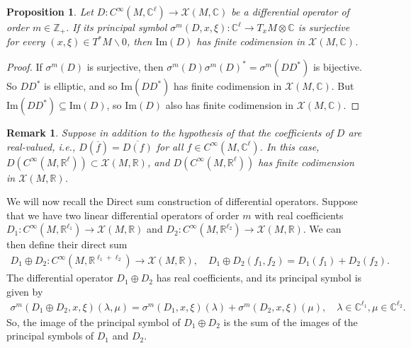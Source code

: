 \documentclass[10pt]{article}
\newcommand{\C}{{\mathbb C}}
\newcommand{\R}{{\mathbb R}}
\newcommand{\Z}{{\mathbb Z}}
\newcommand{\Chi}{{\mathcal X}}
\newtheorem{prop}{Proposition}
\newtheorem{rem}{Remark}
\begin{document}
\begin{prop} \label{theorem : principal symbol surjective}
    Let $D : C^{\infty}(M,\C^\ell)\rightarrow \Chi(M,\C)$ be a differential operator of order $m\in \Z_+$. If its principal symbol $\sigma^m(D,x,\xi): \C^\ell \rightarrow T_xM\otimes \C$ is surjective for every $(x,\xi)\in T^*M \backslash 0$, then $\mathrm{Im}(D)$ has finite codimension in $\Chi(M,\C)$.
\end{prop}
\begin{proof}
    If $\sigma^m(D)$ is surjective, then $\sigma^m(D)\sigma^m(D)^*=\sigma^m(DD^*)$ is bijective. So $DD^*$ is elliptic, and so $\mathrm{Im}(DD^*)$ has finite codimension in $\Chi(M,\C)$. But $\mathrm{Im}(DD^*)\subseteq \mathrm{Im}(D)$, so $\mathrm{Im}(D)$ also has finite codimension in $\Chi(M,\C)$.
\end{proof}

\begin{rem}
    Suppose in addition to the hypothesis of  that the coefficients of $D$ are real-valued, i.e., $D(\overline{f})=\overline{D(f)}$ for all $f\in C^{\infty}(M,\C^\ell)$.
    In this case, $D(C^{\infty}(M,\R^\ell))\subset \Chi(M,\R)$, and $D(C^{\infty}(M,\R^\ell))$ has finite codimension in $\Chi(M,\R)$.
\end{rem}
We will now recall the Direct sum construction of differential operators. Suppose that we have two linear differential operators of order $m$ with real coefficients $D_1:C^{\infty}(M,\R^{\ell_{1}}) \rightarrow \Chi(M,\R)$ and $D_2:C^{\infty}(M,\R^{\ell_{2}}) \rightarrow \Chi(M,\R)$.
We can then define their direct sum
\begin{equation*}\begin{aligned}
        D_1\oplus D_2:C^\infty(M,\R^{\ell_1+\ell_2})\to \Chi(M,\R),\quad D_1\oplus D_2(f_1,f_2)=D_1(f_1)+D_2(f_2).
    \end{aligned}\end{equation*}
The differential operator $D_1\oplus D_2$ has real coefficients, and its principal symbol is given by
\begin{equation*}\begin{aligned}
        \sigma^m(D_1\oplus D_2,x,\xi)(\lambda,\mu)=\sigma^m(D_1,x,\xi)(\lambda)+  \sigma^m(D_2,x,\xi)(\mu) ,\quad \lambda\in \C^{\ell_1},\mu\in \C^{\ell_2}.
    \end{aligned}\end{equation*}
So, the image of the principal symbol of $D_1\oplus D_2$ is the sum of the images of the principal symbols of $D_1$ and $D_2$.
\end{document}
